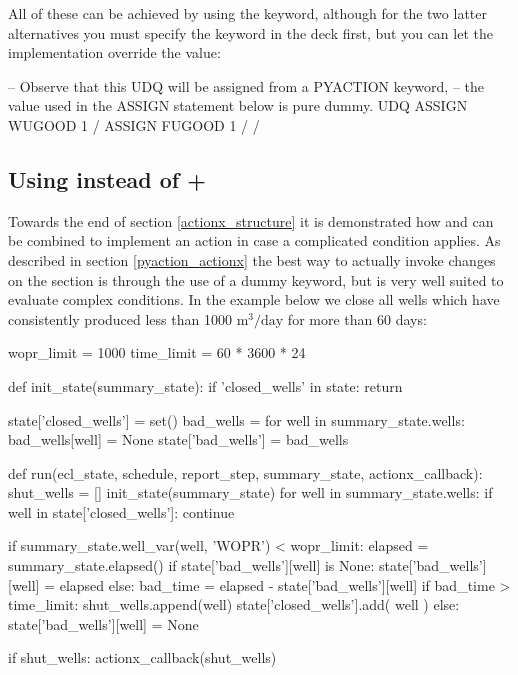 All of these can be achieved by using the \pyaction{} keyword, although for the
two latter alternatives you must specify the \udq{} keyword in the deck first,
but you can let the \pyaction{} implementation override the value:
\begin{deck}
-- Observe that this UDQ will be assigned from a PYACTION keyword,
-- the value used in the ASSIGN statement below is pure dummy.
UDQ
  ASSIGN WUGOOD 1 /
  ASSIGN FUGOOD 1 /
/
\end{deck}

\subsection{Using \pyaction{} instead of \udq{} + \actionx{}}
Towards the end of section \ref{actionx_structure} it is demonstrated how \udq{}
and \actionx{} can be combined to implement an action in case a complicated
condition applies. As described in section \ref{pyaction_actionx} the best way
to actually invoke changes on the  section is through the use of a
dummy \actionx{} keyword, but \pyaction{} is very well suited to evaluate
complex conditions. In the example below we close all wells which have
consistently produced less than 1000 $\mathrm{m^3/day}$ for more than 60 days:

\begin{code}
wopr_limit = 1000
time_limit = 60 * 3600 * 24

def init_state(summary_state):
    if 'closed_wells' in state:
        return

    state['closed_wells'] = set()
    bad_wells = {}
    for well in summary_state.wells:
        bad_wells[well] = None
    state['bad_wells'] = bad_wells


def run(ecl_state, schedule, report_step, summary_state, actionx_callback):
    shut_wells = []
    init_state(summary_state)
    for well in summary_state.wells:
        if well in state['closed_wells']:
           continue

        if summary_state.well_var(well, 'WOPR') < wopr_limit:
            elapsed = summary_state.elapsed()
            if state['bad_wells'][well] is None:
                state['bad_wells'][well] = elapsed
            else:
                bad_time = elapsed - state['bad_wells'][well]
                if bad_time > time_limit:
                    shut_wells.append(well)
                    state['closed_wells'].add( well )
        else:
            state['bad_wells'][well] = None

    if shut_wells:
       actionx_callback(shut_wells)

\end{code}

